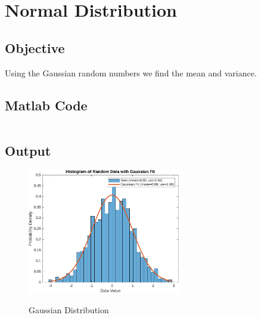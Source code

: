 \section{Normal Distribution}
\label{sec:Normal Distribution}

\subsection{Objective}
Using the Gaussian random numbers we find the mean and variance. 

\subsection{Matlab Code}

\inputminted[fontsize=\footnotesize,autogobble]{matlab}{code/density.m}

\subsection{Output}

\begin{figure}[!htb]
	\centering
	\includegraphics[width=0.6\textwidth]{res/figures/Figure_2.pdf}
	\label{output:gaussian distribution}
	\caption{Gaussian Distribution}
\end{figure}